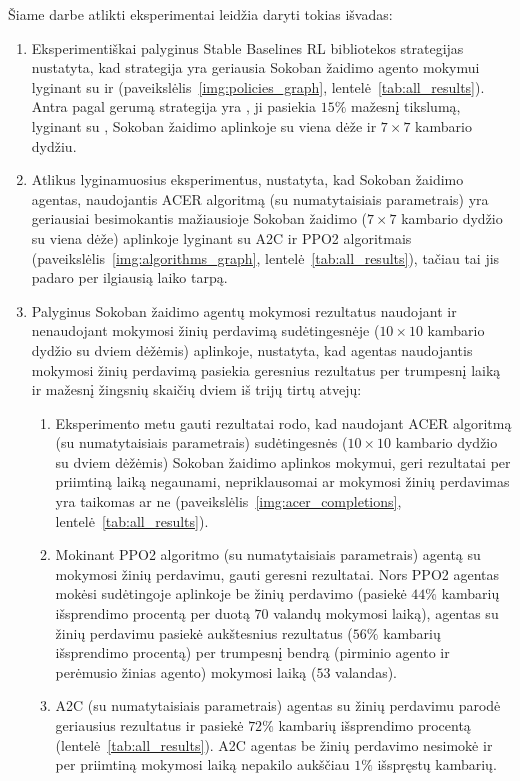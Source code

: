 \documentclass{VUMIFPSbakalaurinis}
\begin{document}
{
	Šiame darbe atlikti eksperimentai leidžia daryti tokias išvadas:
	\begin{enumerate}
		\item Eksperimentiškai palyginus Stable Baselines RL bibliotekos strategijas nustatyta, kad  strategija yra geriausia Sokoban žaidimo agento mokymui lyginant su  ir  (paveikslėlis~\ref{img:policies_graph}, lentelė~\ref{tab:all_results}). Antra pagal gerumą strategija yra , ji pasiekia \(15\%\) mažesnį tikslumą, lyginant su , Sokoban žaidimo aplinkoje su viena dėže ir \(7 \times 7\) kambario dydžiu.
		
		\item Atlikus lyginamuosius eksperimentus, nustatyta, kad Sokoban žaidimo agentas, naudojantis ACER algoritmą (su numatytaisiais parametrais) yra geriausiai besimokantis mažiausioje Sokoban žaidimo (\(7 \times 7\) kambario dydžio su viena dėže) aplinkoje lyginant su A2C ir PPO2 algoritmais (paveikslėlis~\ref{img:algorithms_graph}, lentelė~\ref{tab:all_results}), tačiau tai jis padaro per ilgiausią laiko tarpą.
		
		\item Palyginus Sokoban žaidimo agentų mokymosi rezultatus naudojant ir nenaudojant mokymosi žinių perdavimą sudėtingesnėje (\(10 \times 10\) kambario dydžio su dviem dėžėmis) aplinkoje, nustatyta, kad agentas naudojantis mokymosi žinių perdavimą pasiekia geresnius rezultatus per trumpesnį laiką ir mažesnį žingsnių skaičių dviem iš trijų tirtų atvejų:
		\begin{enumerate}
			\item Eksperimento metu gauti rezultatai rodo, kad naudojant ACER algoritmą (su numatytaisiais parametrais) sudėtingesnės (\(10 \times 10\) kambario dydžio su dviem dėžėmis) Sokoban žaidimo aplinkos mokymui, geri rezultatai per priimtiną laiką negaunami, nepriklausomai ar mokymosi žinių perdavimas yra taikomas ar ne (paveikslėlis~\ref{img:acer_completions}, lentelė~\ref{tab:all_results}).
			
			\item Mokinant PPO2 algoritmo (su numatytaisiais parametrais) agentą su mokymosi žinių perdavimu, gauti geresni rezultatai. Nors PPO2 agentas mokėsi sudėtingoje aplinkoje be žinių perdavimo (pasiekė \(44\%\) kambarių išsprendimo procentą per duotą \(70\) valandų mokymosi laiką), agentas su žinių perdavimu pasiekė aukštesnius rezultatus (\(56\%\) kambarių išsprendimo procentą) per trumpesnį bendrą (pirminio agento ir perėmusio žinias agento) mokymosi laiką (\(53\) valandas).
			
			\item A2C (su numatytaisiais parametrais) agentas su žinių perdavimu parodė geriausius rezultatus ir pasiekė \(72\%\) kambarių išsprendimo procentą (lentelė~\ref{tab:all_results}). A2C agentas be žinių perdavimo nesimokė ir per priimtiną mokymosi laiką nepakilo aukščiau \(1\%\) išspręstų kambarių.
		\end{enumerate}
	\end{enumerate}
}
\printbibliography[heading=bibintoc] 
\end{document}

